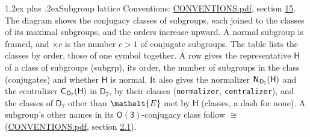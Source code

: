 \documentclass[10pt,a4paper]{article}
\makeatletter
\renewcommand\section{\@startsection{section}{1}{\z@}{-3ex plus -1ex minus -.2ex}%
  {1.2ex plus .2ex}{\normalfont\large\sffamily\bfseries\color{parttitle}}}
\numberwithin{equation}{section}
\newcommand{\eltfont}[1]{{\let\sigma\eltsigma\mathelt{#1}}}
\newcommand{\grp}[1]{\mathsf{#1}}
\newcommand{\cls}[1]{\eltfont{#1}}
\newcommand{\samecls}{\cong}
\newcommand{\nconj}[1]{{\scriptsize$\times#1$}}
\newcommand{\hairsp}{\mkern1mu}
\makeatother
\begin{document}
\section{Subgroup lattice}\label{s:subgroups}
Conventions: \href{../../CONVENTIONS.pdf}{CONVENTIONS.pdf}, section \href{../../CONVENTIONS.pdf\#conv.15}{15}.
The diagram shows the conjugacy classes of subgroups, each joined to the classes of its maximal subgroups, and the orders increase upward. A normal subgroup is framed, and ${\times}c$ is the number $c > 1$ of conjugate subgroups. The table lists the classes by order, those of one symbol together. \label{n:group.H}\label{n:head.subgroup}\label{n:head.order}\label{n:head.conjugates}\label{n:head.normal}A row gives the representative $\grp{H}$ of a class of subgroups (subgrp), its order, the number of subgroups in the class (conjugates) and whether $\grp{H}$ is normal. \label{n:group.normalizer}\label{n:group.centralizer}\label{n:head.classes}It also gives the normalizer $\grp{N}_{\hairsp \grp{D_{7}}}(\grp{H})$ and the centralizer $\grp{C}_{\hairsp \grp{D_{7}}}(\grp{H})$ in $\grp{D_{7}}$, by their classes (\texttt{normalizer}, \texttt{centralizer}), and the classes of $\grp{D_{7}}$ other than $\cls{E}$ met by $\grp{H}$ (classes, a dash for none). A subgroup's other names in its \href{O3.pdf}{$\grp{O(3)}$}-conjugacy class follow $\samecls$ (\href{../../CONVENTIONS.pdf}{CONVENTIONS.pdf}, section \href{../../CONVENTIONS.pdf\#conv.2.1}{2.1}).
\begin{center}
\end{center}
\end{document}
